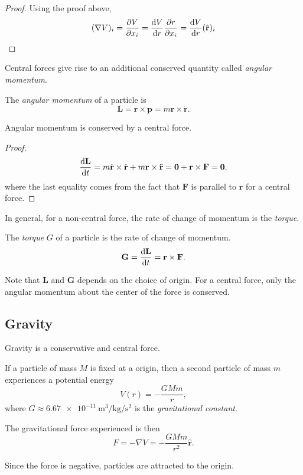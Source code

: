 \documentclass[a4paper]{article}
\begin{document}
\begin{proof}
  Using the proof above,
  \[
    (\nabla V)_i = \frac{\partial V}{\partial x_i} = \frac{\mathrm{d} V}{\mathrm{d} r} \frac{\partial r}{\partial x_i} = \frac{\mathrm{d} V}{\mathrm{d} r}(\hat{\mathbf{r}})_i
  \]
\end{proof}
Central forces give rise to an additional conserved quantity called \emph{angular momentum}.

\begin{defi}
  The \emph{angular momentum} of a particle is
  \[
    \mathbf{L} = \mathbf{r}\times \mathbf{p} = m\mathbf{r}\times \dot{\mathbf{r}}.
  \]
\end{defi}

\begin{prop}
  Angular momentum is conserved by a central force.
\end{prop}

\begin{proof}
  \[
    \frac{\mathrm{d} \mathbf{L}}{\mathrm{d} t} = m\dot{\mathbf{r}} \times \dot{\mathbf{r}} + m\mathbf{r}\times \ddot{\mathbf{r}} = \mathbf{0} + \mathbf{r}\times \mathbf{F} = \mathbf{0}.
  \]
  where the last equality comes from the fact that $\mathbf{F}$ is parallel to $\mathbf{r}$ for a central force.
\end{proof}
In general, for a non-central force, the rate of change of momentum is the \emph{torque}.
\begin{defi}[Torque]
  The \emph{torque} $G$ of a particle is the rate of change of momentum.
  \[
    \mathbf{G} = \frac{\mathrm{d} \mathbf{L}}{\mathrm{d} t} = \mathbf{r}\times \mathbf{F}.
  \]
\end{defi}

Note that $\mathbf{L}$ and $\mathbf{G}$ depends on the choice of origin. For a central force, only the angular momentum about the center of the force is conserved.

\subsection{Gravity}
Gravity is a conservative and central force.
\begin{law}
  If a particle of mass $M$ is fixed at a origin, then a second particle of mass $m$ experiences a potential energy
  \[
    V(r) = -\frac{GMm}{r},
  \]
  where $G \approx \SI{6.67e-11}{\meter\cubed\per\kilogram\per\second\squared}$ is the \emph{gravitational constant}.

  The gravitational force experienced is then
  \[
    F = -\nabla V = -\frac{GMm}{r^2}\hat{\mathbf{r}}.
  \]
\end{law}
Since the force is negative, particles are attracted to the origin.
\end{document}
